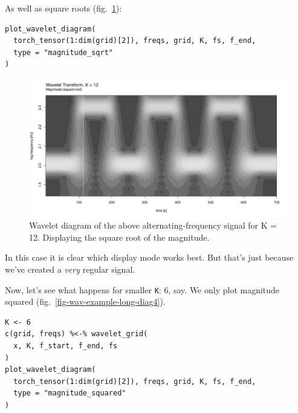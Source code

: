 \documentclass[
  letterpaper,
]{krantz}
\begin{document}
As well as square roots (fig.~\ref{fig-wav-example-long-diag3}):

\begin{verbatim}
plot_wavelet_diagram(
  torch_tensor(1:dim(grid)[2]), freqs, grid, K, fs, f_end,
  type = "magnitude_sqrt"
)
\end{verbatim}

\begin{figure}[H]

{\centering \includegraphics{images/wav-example-long-diag3.png}

}

\caption{\label{fig-wav-example-long-diag3}Wavelet diagram of the above
alternating-frequency signal for K = 12. Displaying the square root of
the magnitude.}

\end{figure}

In this case it is clear which display mode works best. But that's just
because we've created a \emph{very} regular signal.

Now, let's see what happens for smaller \texttt{K}: 6, say. We only plot
magnitude squared (fig.~\ref{fig-wav-example-long-diag4}).

\begin{verbatim}
K <- 6
c(grid, freqs) %<-% wavelet_grid(
  x, K, f_start, f_end, fs
)
plot_wavelet_diagram(
  torch_tensor(1:dim(grid)[2]), freqs, grid, K, fs, f_end,
  type = "magnitude_squared"
)
\end{verbatim}
\end{document}

